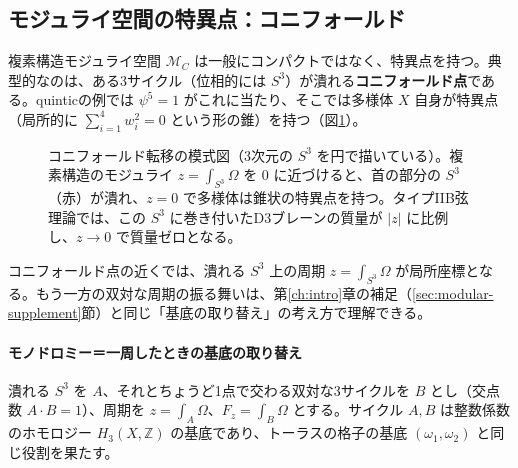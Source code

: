 \documentclass[uplatex, dvipdfmx, book]{jsbook}
\let\origsubsection\subsection
\let\origsubsubsection\subsubsection
\renewcommand{\section}{\origsubsection}
\renewcommand{\subsection}{\origsubsubsection}
\renewcommand{\subsubsection}{\paragraph}
\begin{document}
\section{モジュライ空間の特異点：コニフォールド}

複素構造モジュライ空間 $\mathcal{M}_C$ は一般にコンパクトではなく、特異点を持つ。典型的なのは、ある3サイクル（位相的には $S^3$）が潰れる\textbf{コニフォールド点}である。quinticの例では $\psi^5 = 1$ がこれに当たり、そこでは多様体 $X$ 自身が特異点（局所的に $\sum_{i=1}^4 w_i^2 = 0$ という形の錐）を持つ（図\ref{fig:conifold}）。

\begin{figure}[htbp]
\centering
{}
\caption{コニフォールド転移の模式図（3次元の $S^3$ を円で描いている）。複素構造のモジュライ $z = \int_{S^3}\Omega$ を $0$ に近づけると、首の部分の $S^3$（赤）が潰れ、$z = 0$ で多様体は錐状の特異点を持つ。タイプIIB弦理論では、この $S^3$ に巻き付いたD3ブレーンの質量が $|z|$ に比例し、$z \to 0$ で質量ゼロとなる。}
\label{fig:conifold}
\end{figure}


コニフォールド点の近くでは、潰れる $S^3$ 上の周期 $z = \int_{S^3}\Omega$ が局所座標となる。もう一方の双対な周期の振る舞いは、第\ref{ch:intro}章の補足（\ref{sec:modular-supplement}節）と同じ「基底の取り替え」の考え方で理解できる。

\paragraph{モノドロミー＝一周したときの基底の取り替え}
潰れる $S^3$ を $A$、それとちょうど1点で交わる双対な3サイクルを $B$ とし（交点数 $A \cdot B = 1$）、周期を $z = \int_A \Omega$、$F_z = \int_B \Omega$ とする。サイクル $A, B$ は整数係数のホモロジー $H_3(X, \mathbb{Z})$ の基底であり、トーラスの格子の基底 $(\omega_1, \omega_2)$ と同じ役割を果たす。
\end{document}
